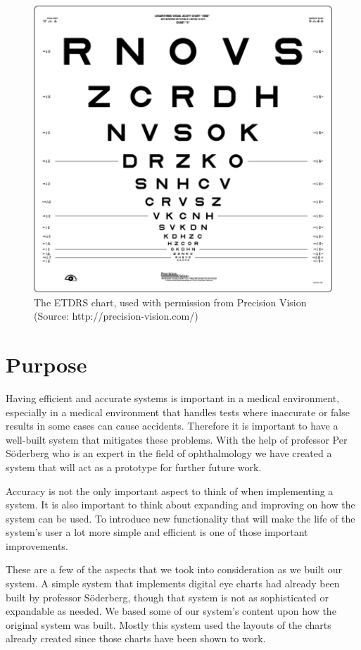 \documentclass[12pt,a4paper,notitlepage]{report}
\begin{document}
\begin{figure}[ht!]
\centering
\includegraphics[width=120mm]{images/etdrs_chart.jpg}
\caption{The ETDRS chart, used with permission from Precision Vision \\ (Source: http://precision-vision.com/)\label{fig:etdrs_chart1}}
\end{figure} 

\section{Purpose}
Having efficient and accurate systems is important in a medical environment, especially in a medical environment that handles tests where inaccurate or false results in some cases can cause accidents. Therefore it is important to have a well-built system that mitigates these problems. With the help of professor Per Söderberg who is an expert in the field of ophthalmology we have created a system that will act as a prototype for further future work. 

Accuracy is not the only important aspect to think of when implementing a system. It is also important to think about expanding and improving on how the system can be used. To introduce new functionality that will make the life of the system's user a lot more simple and efficient is one of those important improvements. 

These are a few of the aspects that we took into consideration as we built our system. A simple system that implements digital eye charts had already been built by professor Söderberg, though that system is not as sophisticated or expandable as needed. We based some of our system's content upon how the original system was built. Mostly this system used the layouts of the charts already created since those charts have been shown to work. 
\end{document}
